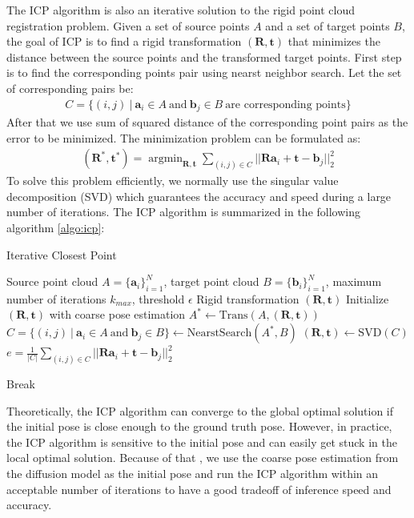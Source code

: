 \documentclass[12pt,DIV14,BCOR12mm,a4paper,footinclude=false,headinclude,parskip=half-,twoside,openright,cleardoublepage=empty,toc=index,bibliography=totoc,listof=totoc]{scrreprt}
\numberwithin{equation}{chapter}
\begin{document}
The ICP algorithm is also an iterative solution to the rigid point cloud registration problem. Given a set of source points $A$ and a set of target points $B$, the goal of ICP is to find a rigid transformation $(\mathbf{R},\mathbf{t})$ that minimizes the distance between the source points and the transformed target points. First step is to find the corresponding points pair using nearst neighbor search. Let the set of corresponding pairs be:
\begin{align}
  C = \{(i,j)\ \vert \ \mathbf{a}_{i}\in A \ \text{and} \ \mathbf{b}_{j}\in B \ \text{are corresponding points}\}
\end{align}
After that we use sum of squared distance of the corresponding point pairs as the error to be minimized. The minimization problem can be formulated as:
\begin{align}
  (\mathbf{R}^{*}, \mathbf{t}^{*})=\mathop{argmin}_{\mathbf{R},\mathbf{t}}\sum_{(i,j)\in C}||\mathbf{Ra}_{i}+\mathbf{t}-\mathbf{b}_{j}||_{2}^{2}
\end{align}
To solve this problem efficiently, we normally use the singular value decomposition (SVD) which guarantees the accuracy and speed during a large number of iterations. The ICP algorithm is summarized in the following algorithm \ref{algo:icp}:
\begin{algorithm}[h]
  \caption{Iterative Closest Point}
  \label{algo:icp}
  \begin{algorithmic}[1]
    \Require
      Source point cloud $A=\{\mathbf{a}_{i}\}_{i=1}^{N}$, target point cloud $B=\{\mathbf{b}_{i}\}_{i=1}^{N}$, maximum number of iterations $k_{max}$, threshold $\epsilon$
    \Ensure
      Rigid transformation $(\mathbf{R},\mathbf{t})$
    \State Initialize $(\mathbf{R},\mathbf{t})$ with coarse pose estimation
      \State $A^{*}\longleftarrow \text{Trans}(A, (\mathbf{R},\mathbf{t}))$
      \State $C=\{(i,j)\ \vert \ \mathbf{a}_{i}\in A \ \text{and} \ \mathbf{b}_{j}\in B \}\longleftarrow \text{NearstSearch}(A^{*}, B)$
      \State $(\mathbf{R}, \mathbf{t})\longleftarrow \text{SVD}(C)$
      \State $e = \frac{1}{\lvert C\rvert}\sum_{(i,j)\in C}||\mathbf{Ra}_{i}+\mathbf{t}-\mathbf{b}_{j}||_{2}^{2}$
      
        \State Break
      \EndIf
    \EndFor
  \end{algorithmic}
\end{algorithm}

Theoretically, the ICP algorithm can converge to the global optimal solution if the initial pose is close enough to the ground truth pose. However, in practice, the ICP algorithm is sensitive to the initial pose and can easily get stuck in the local optimal solution. Because of that , we use the coarse pose estimation from the diffusion model as the initial pose and run the ICP algorithm within an acceptable number of iterations to have a good tradeoff of inference speed and accuracy. 
\end{document}
